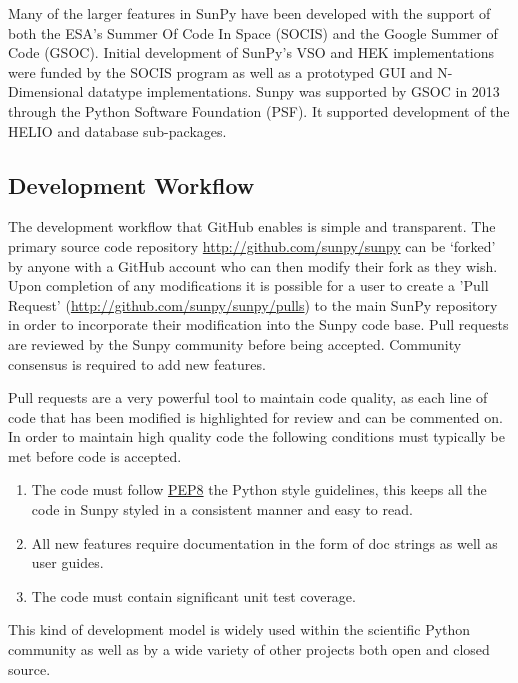 Many of the larger features in SunPy have been developed 
with the support of both the ESA's Summer Of Code In Space (SOCIS) and the Google
Summer of Code (GSOC). Initial development of SunPy's VSO and HEK 
implementations were funded by the SOCIS program as well as a prototyped GUI 
and N-Dimensional datatype implementations. Sunpy was supported by GSOC in 2013 
through the Python Software Foundation (PSF). It supported development of the HELIO and 
database sub-packages.

\subsection{Development Workflow}
The development workflow that GitHub enables is simple and transparent. The 
primary source code repository \url{http://github.com/sunpy/sunpy} can be 
`forked' by anyone with a GitHub account who can then modify their fork as they 
wish. Upon completion of any modifications it is possible for a user to create 
a 'Pull Request' (\url{http://github.com/sunpy/sunpy/pulls}) to the main SunPy 
repository in order to incorporate their modification into the Sunpy code base. 
Pull requests are reviewed by the Sunpy community before being accepted. Community consensus
is required to add new features.

Pull requests are a very powerful tool to maintain code quality, as each line 
of code that has been modified is highlighted for review and can be commented on. 
In order to maintain high quality code the following conditions must typically be met 
before code is accepted.

\begin{enumerate}
	\item  The code must follow 	
	\href{http://www.python.org/dev/peps/pep-0008/}{PEP8} the Python style 
	guidelines, this keeps all the code in Sunpy styled in a consistent manner and easy to read.
	
	\item All new features require documentation in the form of doc strings as well as user
	guides. 
	
	\item The code must contain significant unit test coverage.
\end{enumerate}

This kind of development model is widely used within the scientific Python 
community as well as by a wide variety of other projects both open and closed 
source.